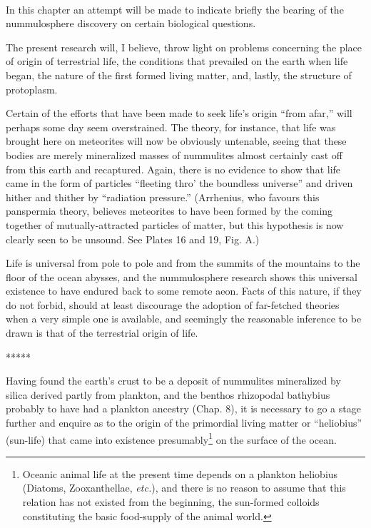 \documentclass[a4paper, 12pt, oneside, landscape]{article}
\begin{document}
\paragraph{}
In this chapter an attempt will be made to indicate briefly the bearing of the nummulosphere discovery on certain biological questions.

The present research will, I believe, throw light on problems concerning the place of origin of terrestrial life, the conditions that prevailed on the earth when life began, the nature of the first formed living matter, and, lastly, the structure of protoplasm.

Certain of the efforts that have been made to seek life's origin ``from afar,'' will perhaps some day seem overstrained. The theory, for instance, that life was brought here on meteorites will now be obviously untenable, seeing that these bodies are merely mineralized masses of nummulites almost certainly cast off from this earth and recaptured. Again, there is no evidence to show that life came in the form of particles ``fleeting thro' the boundless universe'' and driven hither and thither by ``radiation pressure.'' (Arrhenius, who favours this panspermia theory, believes meteorites to have been formed by the coming together of mutually-attracted particles of matter, but this hypothesis is now clearly seen to be unsound. See Plates 16 and 19, Fig. A.)

Life is universal from pole to pole and from the summits of the mountains to the floor of the ocean abysses, and the nummulosphere research shows this universal existence to have endured back to some remote aeon. Facts of this nature, if they do not forbid, should at least discourage the adoption of far-fetched theories when a very simple one is available, and seemingly the reasonable inference to be drawn is that of the terrestrial origin of life.

\centerline{*\hspace{15mm}*\hspace{15mm}*\hspace{15mm}*\hspace{15mm}*}
\bigskip

Having found the earth's crust to be a deposit of nummulites mineralized by silica derived partly from plankton, and the benthos rhizopodal bathybius probably to have had a plankton ancestry (Chap. 8), it is necessary to go a stage further and enquire as to the origin of the primordial living matter or ``heliobius'' (sun-life) that came into existence presumably\footnote{Oceanic animal life at the present time depends on a plankton heliobius (Diatoms, Zooxanthellae, \emph{etc.}), and there is no reason to assume that this relation has not existed from the beginning, the sun-formed colloids constituting the basic food-supply of the animal world.} on the surface of the ocean.
\end{document}
